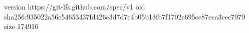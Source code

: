 version https://git-lfs.github.com/spec/v1
oid sha256:935022a56e54653437fd426c3d7d7c4b05b13fb7f1702e695cc87eca3cec7979
size 174916
